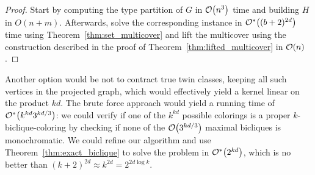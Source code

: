 \begin{proof}
        Start by computing the type partition of $G$ in $\mathcal{O}\!\left(n^3\right)$ time and building $H$ in $O(n + m)$.
        Afterwards, solve the corresponding  instance in $\mathcal{O}^*\!\left((b+2)^{2d}\right)$ time using Theorem~\ref{thm:set_multicover} and lift the multicover using the construction described in the proof of Theorem~\ref{thm:lifted_multicover} in $\mathcal{O}\!\left(n\right)$.
\end{proof}

Another option would be not to contract true twin classes, keeping all such vertices in the projected graph, which would effectively yield a kernel linear on the product $kd$.
The brute force approach would yield a running time of $\mathcal{O}^*\!\left(k^{kd}3^{kd/3}\right)$: we could verify if one of the $k^{kd}$ possible colorings is a proper $k$-biclique-coloring by checking if none of the $\mathcal{O}\!\left(3^{kd/3}\right)$ maximal bicliques is monochromatic.
We could refine our algorithm and use Theorem~\ref{thm:exact_biclique} to solve the problem in $\mathcal{O}^*\!\left(2^{kd}\right)$, which is no better than $(k+2)^{2d} \approx k^{2d} = 2^{2d\log k}$.
